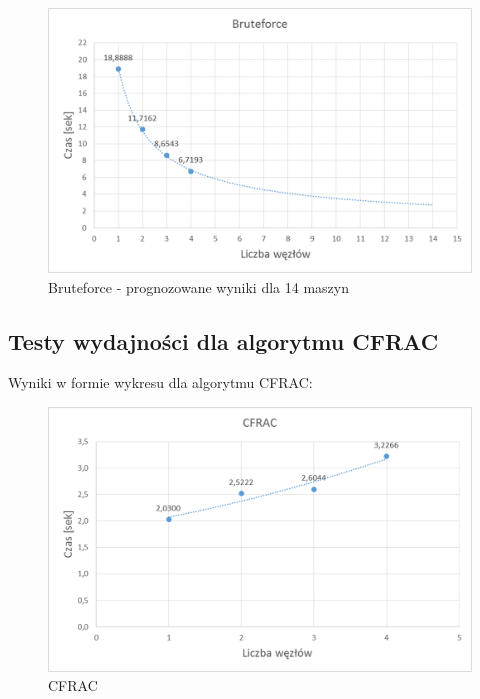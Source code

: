 \documentclass{article}
\begin{document}
\begin{figure}[h!]
    \includegraphics[width=\linewidth]{Bruteforce_prognoza.png}
    \caption{Bruteforce - prognozowane wyniki dla 14 maszyn}
    \label{fig:userpagescr}
\end{figure}
\newpage
\subsection{Testy wydajności dla algorytmu CFRAC}
Wyniki w formie wykresu dla algorytmu CFRAC:
\begin{figure}[h!]
    \includegraphics[width=\linewidth]{CFRAC.png}
    \caption{CFRAC}
    \label{fig:userpagescr}
\end{figure}
\end{document}

